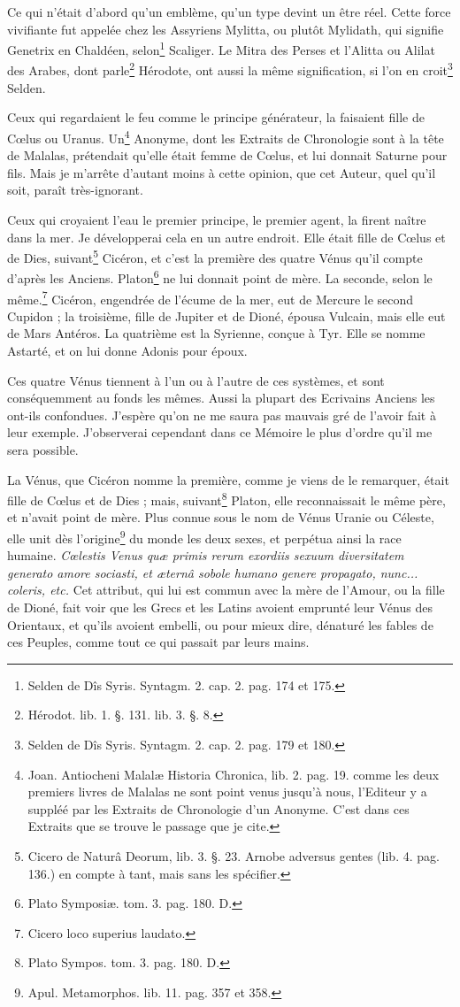 \documentclass[a4paper, 18pt, oneside]{article}
\begin{document}
Ce qui n'était d'abord qu'un emblème, qu'un type devint un être réel. Cette force vivifiante fut appelée chez les Assyriens Mylitta, ou plutôt Mylidath, qui signifie Genetrix en Chaldéen, selon\footnote{Selden de Dîs Syris. Syntagm. 2. cap. 2. pag. 174 et 175.} Scaliger. Le Mitra des Perses et l'Alitta ou Alilat des Arabes, dont parle\footnote{Hérodot. lib. 1. §. 131. lib. 3. §. 8.} Hérodote, ont aussi la même signification, si l'on en croit\footnote{Selden de Dîs Syris. Syntagm. 2. cap. 2. pag. 179 et 180.} Selden.

Ceux qui regardaient le feu comme le principe générateur, la faisaient fille de Cœlus ou Uranus. Un\footnote{Joan. Antiocheni Malalæ Historia Chronica, lib. 2. pag. 19. comme les deux premiers livres de Malalas ne sont point venus jusqu'à nous, l'Editeur y a suppléé par les Extraits de Chronologie d'un Anonyme. C'est dans ces Extraits que se trouve le passage que je cite.} Anonyme, dont les Extraits de Chronologie sont à la tête de Malalas, prétendait qu'elle était femme de Cœlus, et lui donnait Saturne pour fils. Mais je m'arrête d'autant moins à cette opinion, que cet Auteur, quel qu'il soit, paraît très-ignorant.

Ceux qui croyaient l'eau le premier principe, le premier agent, la firent naître dans la mer. Je développerai cela en un autre endroit. Elle était fille de Cœlus et de Dies, suivant\footnote{Cicero de Naturâ Deorum, lib. 3. §. 23. Arnobe adversus gentes (lib. 4. pag. 136.) en compte à tant, mais sans les spécifier.} Cicéron, et c'est la première des quatre Vénus qu'il compte d'après les Anciens. Platon\footnote{Plato Symposiæ. tom. 3. pag. 180. D.} ne lui donnait point de mère. La seconde, selon le même.\footnote{Cicero loco superius laudato.} Cicéron, engendrée de l'écume de la mer, eut de Mercure le second Cupidon ; la troisième, fille de Jupiter et de Dioné, épousa Vulcain, mais elle eut de Mars Antéros. La quatrième est la Syrienne, conçue à Tyr. Elle se nomme Astarté, et on lui donne Adonis pour époux.

Ces quatre Vénus tiennent à l'un ou à l'autre de ces systèmes, et sont conséquemment au fonds les mêmes. Aussi la plupart des Ecrivains Anciens les ont-ils confondues. J'espère qu'on ne me saura pas mauvais gré de l'avoir fait à leur exemple. J'observerai cependant dans ce Mémoire le plus d'ordre qu'il me sera possible.

La Vénus, que Cicéron nomme la première, comme je viens de le remarquer, était fille de Cœlus et de Dies ; mais, suivant\footnote{Plato Sympos. tom. 3. pag. 180. D.} Platon, elle reconnaissait le même père, et n'avait point de mère. Plus connue sous le nom de Vénus Uranie ou Céleste, elle unit dès l'origine\footnote{Apul. Metamorphos. lib. 11. pag. 357 et 358.} du monde les deux sexes, et perpétua ainsi la race humaine. \emph{Cœlestis Venus quæ primis rerum exordiis sexuum diversitatem generato amore sociasti, et æternâ sobole humano genere propagato, nunc... coleris, etc.} Cet attribut, qui lui est commun avec la mère de l'Amour, ou la fille de Dioné, fait voir que les Grecs et les Latins avoient emprunté leur Vénus des Orientaux, et qu'ils avoient embelli, ou pour mieux dire, dénaturé les fables de ces Peuples, comme tout ce qui passait par leurs mains.
\end{document}
